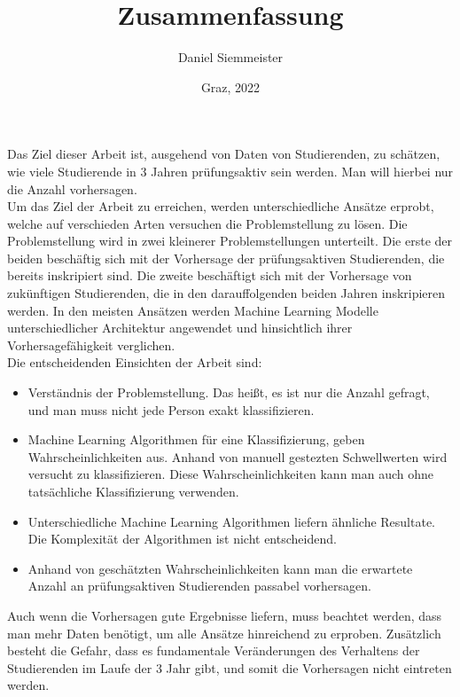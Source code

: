 \documentclass[a4paper, german, 11pt]{article}
\title{Zusammenfassung}
\author{Daniel Siemmeister}
\date{Graz, 2022}
\begin{document}
\maketitle
\thispagestyle{empty}

Das Ziel dieser Arbeit ist, ausgehend von Daten von Studierenden, zu sch\"atzen, wie viele 
Studierende in 3 Jahren pr\"ufungsaktiv sein werden. Man will hierbei nur die Anzahl vorhersagen. \\

Um das Ziel der Arbeit zu erreichen, werden unterschiedliche Ans\"atze erprobt, welche auf verschieden Arten versuchen die Problemstellung zu l\"osen.
Die Problemstellung wird in zwei kleinerer Problemstellungen unterteilt. Die erste der beiden besch\"aftig sich mit der Vorhersage der pr\"ufungsaktiven Studierenden, 
die bereits inskripiert sind. Die zweite besch\"aftigt sich mit der Vorhersage von zuk\"unftigen Studierenden, die in den darauffolgenden beiden Jahren inskripieren werden.
In den meisten Ans\"atzen werden Machine Learning Modelle unterschiedlicher Architektur angewendet und hinsichtlich ihrer Vorhersagef\"ahigkeit 
verglichen. \\ 

Die entscheidenden Einsichten der Arbeit sind:
\begin{itemize}
    \item Verst\"andnis der Problemstellung. Das hei{\ss}t, es ist nur die Anzahl gefragt, und man muss nicht jede Person exakt klassifizieren.
    \item Machine Learning Algorithmen f\"ur eine Klassifizierung, geben Wahrscheinlichkeiten aus. Anhand von manuell gestezten Schwellwerten wird versucht zu klassifizieren.
    Diese Wahrscheinlichkeiten kann man auch ohne tats\"achliche Klassifizierung verwenden.
    \item Unterschiedliche Machine Learning Algorithmen liefern \"ahnliche Resultate. Die Komplexit\"at der Algorithmen ist nicht entscheidend.
    \item Anhand von gesch\"atzten Wahrscheinlichkeiten kann man die erwartete Anzahl an pr\"ufungsaktiven Studierenden passabel vorhersagen.
\end{itemize}

Auch wenn die Vorhersagen gute Ergebnisse liefern, muss beachtet werden, dass man mehr Daten ben\"otigt, um alle Ans\"atze hinreichend zu erproben. 
Zus\"atzlich besteht die Gefahr, dass es fundamentale Ver\"anderungen des Verhaltens der Studierenden im Laufe der 3 Jahr gibt, und somit die Vorhersagen 
nicht eintreten werden.
\end{document}
